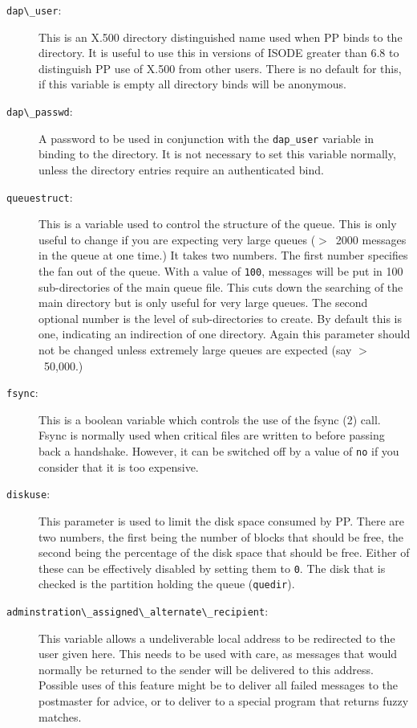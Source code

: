 \begin{description}
\item[\verb|dap\_user|:]
This is an X.500 directory distinguished name
used when PP binds to the directory. It is useful to use this in
versions of ISODE greater than 6.8 to distinguish PP use of X.500 from
other users. There is no default for this, if this variable is empty
all directory binds will be anonymous.

\item[\verb|dap\_passwd|:]
A password to be used in conjunction with
the \verb|dap_user| variable in binding to the directory. It is not
necessary to set this variable normally, unless the directory entries
require an authenticated bind.

\item[\verb|queuestruct|:]
This is a variable used to control the structure of the queue. This is
only useful to change if you are expecting very large queues ($>$~2000
messages in the queue at one time.) It takes two numbers. The first
number specifies the fan out of the queue. With a value of
\verb|100|, messages will be put in 100 sub-directories of the main
queue file. This cuts down the searching of the main directory but is
only useful for very large queues. The second optional number is the
level of sub-directories to create. By default this is one, indicating
an indirection of one directory. Again this parameter should not
be changed unless extremely large queues are expected (say $>$~50,000.)

\item[\verb|fsync|:] This is a boolean variable which controls the use
of the \man fsync (2) call. Fsync is normally used when critical files
are written to before passing back a handshake. However, it can be
switched off by a value of \verb|no| if you consider that it is too
expensive.

\item[\verb|diskuse|:] This parameter is used to limit the disk space
consumed by PP. There are two numbers, the first being the number of blocks
that should be free, the second being the percentage of the disk space
that should be free. Either of these can be effectively disabled by
setting them to \verb|0|. The disk that is checked is the partition
holding the queue (\verb|quedir|).

\item[\verb|adminstration\_assigned\_alternate\_recipient|:]
This variable allows a undeliverable local address to be redirected to
the user given here. This needs to be used with care, as messages that
would normally be returned to the sender will be delivered to this
address. Possible uses of this feature might be to deliver all failed
messages to the postmaster for advice, or to deliver to a special
program that returns fuzzy matches.
\end{description}

